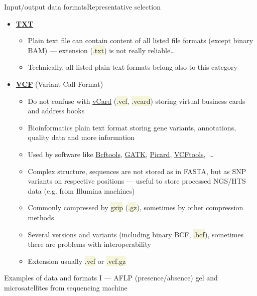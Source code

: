 \documentclass[compress, ucs, xelatex, 11pt, xcolor=svgnames, aspectratio=169,
	hyperref={
		bookmarks=true,
		unicode=true,
		colorlinks=true,
		pdftitle={Molecular data in R},
		plainpages=false,
		pdfauthor={Vojtech Zeisek},
		pdfsubject={Course about phylogeny and evolution in R},
		pdfcreator={XeLaTeX},
		pdfkeywords={R, evolution, phylogeny, molecular data},
		linkcolor=Crimson, %
		anchorcolor=Magenta, %
		citecolor=Magenta, %
		filecolor=Magenta, %
		menucolor=Magenta, %
		urlcolor=DodgerBlue, %
		pdftex},
	url={hyphens, lowtilde} %
	]{beamer}
\renewcommand{\texttt}[1]{\colorbox{Beige}{{\ttfamily #1}}}
\begin{document}
\begin{frame}[allowframebreaks]{Input/output data formats}{Representative selection}
\begin{itemize}
\begin{itemize}
			\item Extension usually \texttt{*.tsv}, \texttt{*.tab}
		\end{itemize}
		\item \href{https://en.wikipedia.org/wiki/Text_file}{\textbf{TXT}}
		\begin{itemize}
			\item Plain text file can contain content of all listed file formats (except binary BAM) --- extension (\texttt{*.txt}) is not really reliable\ldots
			\item Technically, all listed plain text formats belong also to this category
		\end{itemize}
		\item \href{https://en.wikipedia.org/wiki/Variant_Call_Format}{\textbf{VCF}} (Variant Call Format)
		\begin{itemize}
			\item Do not confuse with \href{https://en.wikipedia.org/wiki/VCard}{vCard} (\texttt{*.vcf}, \texttt{*.vcard}) storing virtual business cards and address books
			\item Bioinformatics plain text format storing gene variants, annotations, quality data and more information
			\item Used by software like \href{https://samtools.github.io/bcftools/}{Bcftools}, \href{https://gatk.broadinstitute.org/hc/en-us}{GATK}, \href{https://broadinstitute.github.io/picard/}{Picard}, \href{https://vcftools.github.io/}{VCFtools},~\ldots
			\item Complex structure, sequences are not stored as in FASTA, but as SNP variants on respective positions --- useful to store processed NGS/HTS data (e.g. from Illumina machines)
			\item Commonly compressed by \texttt{gzip} (\texttt{*.gz}), sometimes by other compression methods
			\item Several versions and variants (including binary BCF, \texttt{*.bcf}), sometimes there are problems with interoperability
			\item Extension usually \texttt{*.vcf} or \texttt{*.vcf.gz}
		\end{itemize}
	\end{itemize}
\end{frame}

\begin{frame}{Examples of data and formats I --- AFLP (presence/absence) gel and microsatellites from sequencing machine}
	\begin{center}
		\texttt{[image: aflp\_ssrs.png]}
	\end{center}
\end{frame}
\end{document}
